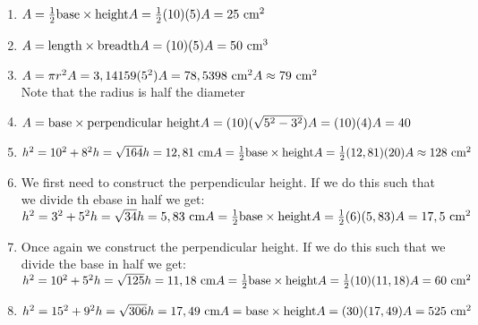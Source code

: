  \begin{solutions}{}{
\begin{enumerate}[itemsep=5pt, label=\textbf{\arabic*}. ] 
\item 
$A = \frac{1}{2} \mbox{base} \times \mbox{height}\\
A = \frac{1}{2}(10)(5)\\
A = 25 \mbox{ cm}^{2}$
\item
$A = \mbox{length} \times \mbox{breadth}\\
A = (10)(5)\\
A = 50 \mbox{ cm}^{3}$
\item
$A = \pi r^{2}\\
A = 3,14159(5^{2})\\
A = 78,5398 \mbox{ cm}^{2}\\
A \approx 79 \mbox{ cm}^{2}$\\
Note that the radius is half the diameter
\item
$A = \mbox{base} \times \mbox{perpendicular height}\\
A = (10)(\sqrt{5^{2} - 3^{2}}) \\
A = (10)(4) \\
A = 40$
\item
$h^{2} = 10^{2} + 8^{2} \\
h = \sqrt{164}\\
h = 12,81 \mbox{ cm}\\
A = \frac{1}{2} \mbox{base} \times \mbox{height}\\
A = \frac{1}{2} (12,81)(20)\\
A \approx 128 \mbox{ cm}^2$
\item
We first need to construct the perpendicular height. If we do this such that we divide th ebase in half we get:\\
$h^2 = 3^2 + 5^2 \\
h = \sqrt{34}\\
h = 5,83 \mbox{ cm}\\
A = \frac{1}{2}\mbox{base} \times \mbox{height}\\
A = \frac{1}{2}(6)(5,83)\\
A = 17,5 \mbox{ cm}^{2}$
\item Once again we construct the perpendicular height. If we do this such that we divide the base in half we get:\\
$h^2 = 10^2 + 5^2 \\
h = \sqrt{125}\\
h = 11,18 \mbox{ cm}\\
A = \frac{1}{2}\mbox{base} \times \mbox{height}\\
A = \frac{1}{2}(10)(11,18)\\
A = 60 \mbox{ cm}^{2}$
\item
$h^2 = 15^2 + 9^2 \\
h = \sqrt{306}\\
h = 17,49 \mbox{ cm}\\
A = \mbox{base} \times \mbox{height}\\
A = (30)(17,49)\\
A = 525 \mbox{ cm}^{2}$
\end{enumerate}}
\end{solutions}


